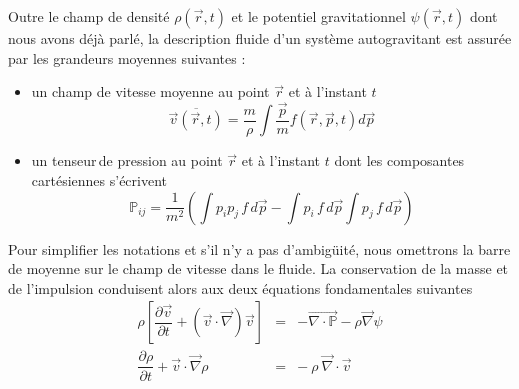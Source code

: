 Outre le champ de densité $\rho(\vec r, t)$ et le potentiel gravitationnel $\psi(\vec r, t)$ dont nous avons déjà parlé, la description fluide d'un syst\`{e}me autogravitant est assurée par les grandeurs moyennes suivantes :
\begin{itemize}
\item un champ de vitesse moyenne au point $\vec{r}
$ et \`{a} l'instant $t$
\[
\overline{{\vec{v}}\left(  {\vec{r}},t\right)  }
=
\frac{m}{\rho}\int \frac{\vec{p}}{m} f\left(  \vec{r},\vec{p},t\right)  d\vec{p}
\]
\item un \og tenseur\fg\,de pression au point $\vec{r}$ et \`{a} l'instant $t$ dont les composantes cartésiennes s'écrivent
\[
\mathbb{P}_{ij}
=
\frac{1}{m^{2}}\left(  \int p_{i}p_{j}\,f\,d\vec{p} - \int p_{i}\,f\,d\vec{p}\int p_{j}\,f\,d\vec{p}\right)
\]
\end{itemize}
Pour simplifier les notations et s'il n'y a pas d'ambigüité, nous omettrons la barre de moyenne sur le champ de vitesse dans le fluide. La conservation de la masse et de l'impulsion conduisent alors aux deux équations fondamentales suivantes
\begin{subequations}\label{eq:sys-fluide}
  \begin{eqnarray}
  \rho\left[  \dfrac{\partial\vec{v}}{\partial t}+\left(  \vec{v}\cdot\vec{\nabla}\right)  \vec{v}\right]  &=&-\overrightarrow{\nabla\cdot\mathbb{P}}-\rho
\vec{\nabla}\psi
\label{eulerjeans} \\
\dfrac{\partial\rho}{\partial t}+\vec{v}\cdot\vec{\nabla}\rho&=&-\ \rho
\ \vec{\nabla}\cdot\vec{v}
 \label{continuitejeans} 
\end{eqnarray}
\end{subequations} 

